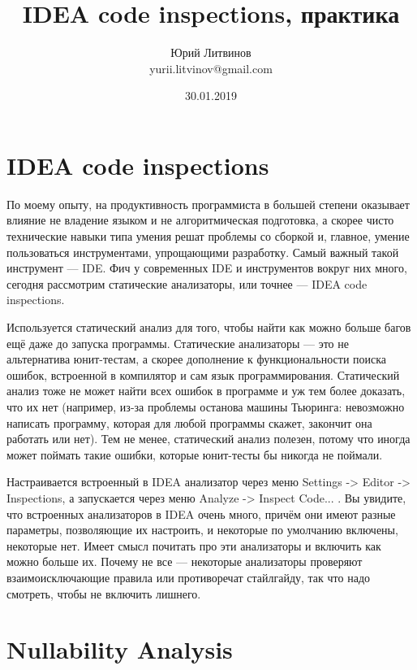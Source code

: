\documentclass[a5paper]{article}
\title{IDEA code inspections, практика}
\author{Юрий Литвинов\\\small{yurii.litvinov@gmail.com}}
\date{30.01.2019}
\begin{document}
\maketitle
\thispagestyle{empty}

\section{IDEA code inspections}

По моему опыту, на продуктивность программиста в большей степени оказывает влияние не владение языком и не алгоритмическая подготовка, а скорее чисто технические навыки типа умения решат проблемы со сборкой и, главное, умение пользоваться инструментами, упрощающими разработку. Самый важный такой инструмент --- IDE. Фич у современных IDE и инструментов вокруг них много, сегодня рассмотрим статические анализаторы, или точнее --- IDEA code inspections.

Используется статический анализ для того, чтобы найти как можно больше багов ещё даже до запуска программы. Статические анализаторы --- это не альтернатива юнит-тестам, а скорее дополнение к функциональности поиска ошибок, встроенной в компилятор и сам язык программирования. Статический анализ тоже не может найти всех ошибок в программе и уж тем более доказать, что их нет (например, из-за проблемы останова машины Тьюринга: невозможно написать программу, которая для любой программы скажет, закончит она работать или нет). Тем не менее, статический анализ полезен, потому что иногда может поймать такие ошибки, которые юнит-тесты бы никогда не поймали. 

Настраивается встроенный в IDEA анализатор через меню Settings -> Editor -> Inspections, а запускается через меню Analyze -> Inspect Code... . Вы увидите, что встроенных анализаторов в IDEA очень много, причём они имеют разные параметры, позволяющие их настроить, и некоторые по умолчанию включены, некоторые нет. Имеет смысл почитать про эти анализаторы и включить как можно больше их. Почему не все --- некоторые анализаторы проверяют взаимоисключающие правила или противоречат стайлгайду, так что надо смотреть, чтобы не включить лишнего.

\section{Nullability Analysis}
\end{document}
